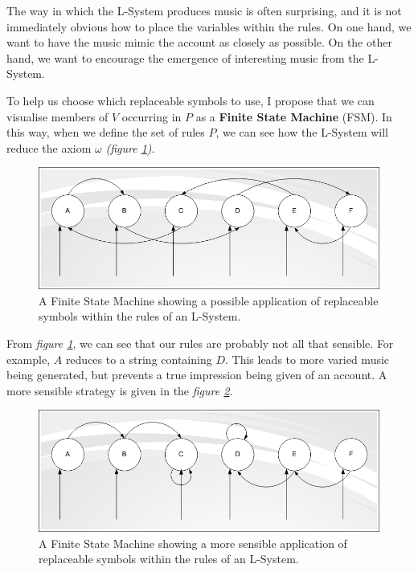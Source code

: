 The way in which the L-System produces music is often surprising, and it is not immediately obvious how to place the variables within the rules. On one hand, we want to have the music mimic the account as closely as possible. On the other hand, we want to encourage the emergence of interesting music from the L-System.

To help us choose which replaceable symbols to use, I propose that we can visualise members of $V$ occurring in $P$ as a \textbf{Finite State Machine} (FSM). In this way, when we define the set of rules $P$, we can see how the L-System will reduce the axiom $\omega$ \textit{(figure \ref{fig:fsm1})}.

\begin{figure}[ht]
\centering
\includegraphics[scale=1.5]{fsm1}
\caption{A Finite State Machine showing a possible application of replaceable symbols within the rules of an L-System.}
\label{fig:fsm1}
\end{figure}

From \textit{figure \ref{fig:fsm1}}, we can see that our rules are probably not all that sensible. For example, $A$ reduces to a string containing $D$. This leads to more varied music being generated, but prevents a true impression being given of an account. A more sensible strategy is given in the \textit{figure \ref{fig:fsm2}}.

\begin{figure}[ht]
\centering
\includegraphics[scale=1.5]{fsm2}
\caption{A Finite State Machine showing a more sensible application of replaceable symbols within the rules of an L-System.}
\label{fig:fsm2}
\end{figure}


